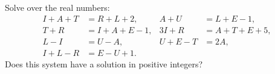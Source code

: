 Solve over the real numbers:
\[\begin{aligned}I+A+T&=R+L+2,&A+U&=L+E-1,\\T+R&=I+A+E-1,&3I+R&=A+T+E+5,\\L-I&=U-A,&U+E-T&=2A,\\I+L-R&=E-U+1.\end{aligned}\]
Does this system have a solution in positive integers?
